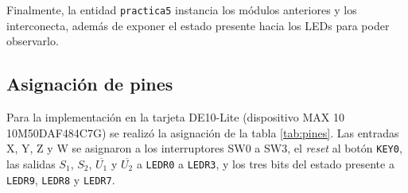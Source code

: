 
\label{fig:divfrec}

Finalmente, la entidad \texttt{practica5} instancia los módulos anteriores y los interconecta,
además de exponer el estado presente hacia los LEDs para poder observarlo.


\label{fig:top}

\subsection{Asignación de pines}

Para la implementación en la tarjeta DE10-Lite (dispositivo MAX 10 10M50DAF484C7G) se realizó la
asignación de la tabla \ref{tab:pines}. Las entradas X, Y, Z y W se asignaron a los interruptores
SW0 a SW3, el \textit{reset} al botón \texttt{KEY0}, las salidas $S_1$, $S_2$, $\overline{U_1}$ y
$\overline{U_2}$ a \texttt{LEDR0} a \texttt{LEDR3}, y los tres bits del estado presente a
\texttt{LEDR9}, \texttt{LEDR8} y \texttt{LEDR7}.

